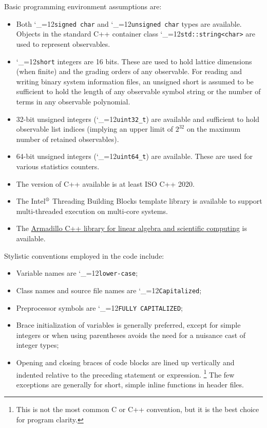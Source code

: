 \documentclass [12pt]{article}
\makeatletter
\renewcommand{\tt}{\begingroup\catcode`_=12\def\_{\string_}\tt@}
\newcommand{\tt@}[1]{\texttt{#1}\endgroup}
\makeatother
\begin{document}
Basic programming environment assumptions are:
\begin{itemize}\advance\itemsep -3pt
\item
    Both \tt{signed char} and \tt{unsigned char}
    types are available.
    Objects in the standard C++ container class
    \tt{std::string<char>} are used to
    represent observables.
\item
    \tt{short} integers are 16 bits.
    These are used to hold lattice dimensions (when finite)
    and the grading orders of any observable.
    For reading and writing binary system information files,
    an unsigned short is assumed to be sufficient to
    hold the length of any observable symbol string
    or the number of terms in any observable polynomial.
\item
    32-bit unsigned integers (\tt{uint32_t}) are available
    and sufficient to hold observable list indices
    (implying an upper limit of $2^{32}$ on the maximum number of
    retained observables).
\item
    64-bit unsigned integers (\tt{uint64_t}) are available.
    These are used for various statistics counters.
\item
    The version of C++ available is at least ISO C++ 2020.
\item
    The Intel$^{\text{\textregistered}}$ Threading Building Blocks template library
    \cite{IntelTBB}
    is available to support multi-threaded execution on multi-core systems.
\item
    The \href{https://arma.sourceforge.net}{Armadillo C++ library
    for linear algebra and scientific computing} is available.
\end{itemize}

Stylistic conventions employed in the code include:
\begin{itemize}\advance\itemsep -3pt
\item
    Variable names are \tt{lower-case};
\item
    Class names and source file names are \tt{Capitalized};
\item
    Preprocessor symbols are \tt{FULLY CAPITALIZED};
\item
    Brace initialization of variables is generally preferred,
    except for simple integers or when using parentheses
    avoids the need for a nuisance cast of integer types;
\item
    Opening and closing braces of code blocks are lined up vertically
    and indented relative to the preceding statement or expression.%
    \footnote
	{
	This is not the most common C or C++ convention, but it is the best choice
	for program clarity.
	}
    The few exceptions are generally for short, simple inline functions in header files.
\end{itemize}
\end{document}
